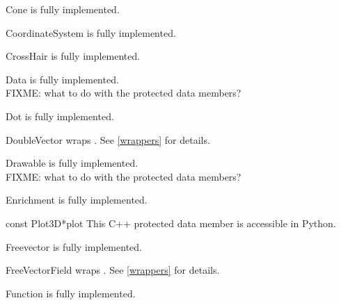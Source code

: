 \documentclass{manual}
\begin{document}
\begin{classdesc*}{Cone}
  is fully implemented.
\end{classdesc*}

\begin{classdesc*}{CoordinateSystem}
  is fully implemented.
\end{classdesc*}

\begin{classdesc*}{CrossHair}
  is fully implemented.
\end{classdesc*}

\begin{classdesc*}{Data}
  is fully implemented.\\
  FIXME: what to do with the protected data members?
\end{classdesc*}

\begin{classdesc*}{Dot}
  is fully implemented.
\end{classdesc*}

\begin{classdesc*}{DoubleVector}
  wraps . See \ref{wrappers} for details.
\end{classdesc*}

\begin{classdesc*}{Drawable}
  is fully implemented.\\
  FIXME: what to do with the protected data members?
\end{classdesc*}

\begin{classdesc*}{Enrichment}
  is fully implemented.\\
  \begin{cvardesc}{const Plot3D*}{plot}
    This C++ protected data member is accessible in Python.
  \end{cvardesc}
\end{classdesc*}

\begin{classdesc*}{Freevector}
  is fully implemented.
\end{classdesc*}

\begin{classdesc*}{FreeVectorField}
  wraps . See \ref{wrappers} for details.
\end{classdesc*}

\begin{classdesc*}{Function}
  is fully implemented.
\end{classdesc*}
\end{document}
